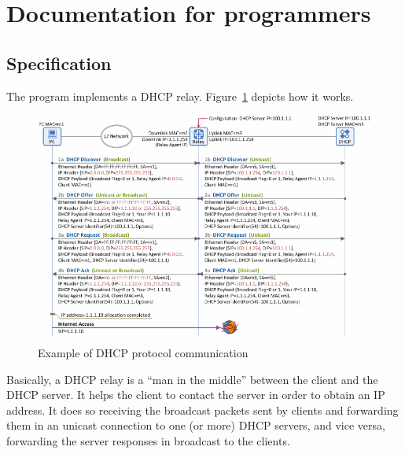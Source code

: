 \newpage
\section{Documentation for programmers}
\subsection{Specification}
The program implements a DHCP relay. Figure~\ref{fig:dhcp} depicts how it works.
\begin{figure}[h]
	\centering\includegraphics[scale=0.58]{images/dhcp}
	\caption{Example of DHCP protocol communication\protect\footnotemark}
	\label{fig:dhcp}
\end{figure}

Basically, a DHCP relay is a ``man in the middle'' between the client and the DHCP server. It helps the client to contact the server in order to obtain an IP address. It does so receiving the broadcast packets sent by clients and forwarding them in an unicast connection to one (or more) DHCP servers, and vice versa, forwarding the server responses in broadcast to the clients.

